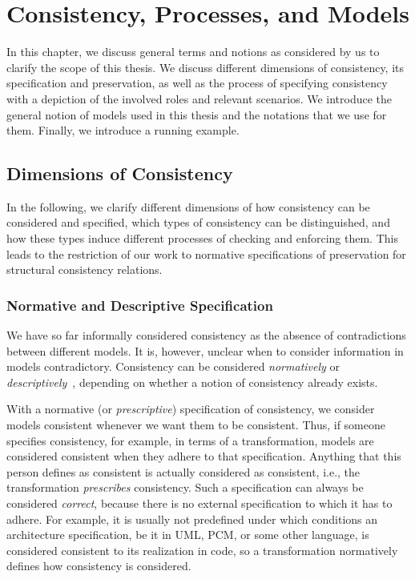 \chapter{Consistency, Processes, and Models
}
\label{chap:networks}

In this chapter, we discuss general terms and notions as considered by us to clarify the scope of this thesis.
We discuss different dimensions of consistency, its specification and preservation, as well as the process of specifying consistency with a depiction of the involved roles and relevant scenarios.
We introduce the general notion of models used in this thesis and the notations that we use for them.
Finally, we introduce a running example.


\section{Dimensions of Consistency}

In the following, we clarify different dimensions of how consistency can be considered and specified, which types of consistency can be distinguished, and how these types induce different processes of checking and enforcing them.
This leads to the restriction of our work to normative specifications of preservation for structural consistency relations.

\subsection{Normative and Descriptive Specification}
\label{chap:networks:notions:normative_descriptive}

We have so far informally considered consistency as the absence of contradictions between different models.
It is, however, unclear when to consider information in models contradictory.
Consistency can be considered \emph{normatively} or \emph{descriptively}~\cite[Sec.~3.1.2]{kramer2017a}, depending on whether a notion of consistency already exists.

With a normative (or \emph{prescriptive}) specification of consistency, we consider models consistent whenever we want them to be consistent.
Thus, if someone specifies consistency, for example, in terms of a transformation, models are considered consistent when they adhere to that specification.
Anything that this person defines as consistent is actually considered as consistent, i.e., the transformation \emph{prescribes} consistency.
Such a specification can always be considered \emph{correct}, because there is no external specification to which it has to adhere.
For example, it is usually not predefined under which conditions an architecture specification, be it in \gls{UML}, \gls{PCM}, or some other language, is considered consistent to its realization in code, so a transformation normatively defines how consistency is considered.

